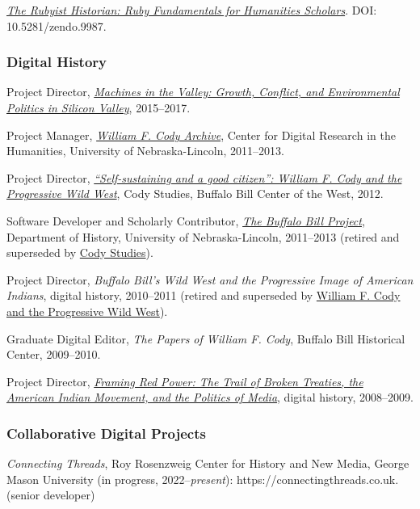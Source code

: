 \emph{\href{http://hepplerj.github.io/rubyist-historian/}{The Rubyist
Historian: Ruby Fundamentals for Humanities Scholars}}. DOI:
10.5281/zendo.9987.

\hypertarget{digital-history}{%
\subsubsection{Digital History}\label{digital-history}}

Project Director,
\emph{\href{http://dissertation.jasonheppler.org}{Machines in the
Valley: Growth, Conflict, and Environmental Politics in Silicon
Valley}}, 2015--2017.

Project Manager, \emph{\href{http://codyarchive.org/}{William F. Cody
Archive}}, Center for Digital Research in the Humanities, University of
Nebraska-Lincoln, 2011--2013.

Project Director,
\emph{\href{http://www.codystudies.org/showindians/}{``Self-sustaining
and a good citizen'': William F. Cody and the Progressive Wild West}},
Cody Studies, Buffalo Bill Center of the West, 2012.

Software Developer and Scholarly Contributor,
\emph{\href{http://buffalobillproject.unl.edu/}{The Buffalo Bill
Project}}, Department of History, University of Nebraska-Lincoln,
2011--2013 (retired and superseded by
\href{http://www.codystudies.org/}{Cody Studies}).

Project Director, \emph{Buffalo Bill's Wild West and the Progressive
Image of American Indians}, digital history, 2010--2011 (retired and
superseded by \href{http://www.codystudies.org/showindians/}{William F.
Cody and the Progressive Wild West}).

Graduate Digital Editor, \emph{The Papers of William F. Cody}, Buffalo
Bill Historical Center, 2009--2010.

Project Director, \emph{\href{http://framingredpower.org}{Framing Red
Power: The Trail of Broken Treaties, the American Indian Movement, and
the Politics of Media}}, digital history, 2008--2009.

\hypertarget{collaborative-digital-projects}{%
\subsubsection{Collaborative Digital
Projects}\label{collaborative-digital-projects}}

\emph{Connecting Threads}, Roy Rosenzweig Center for History and New
Media, George Mason University (in progress, 2022--\emph{present}):
https://connectingthreads.co.uk. (senior developer)

